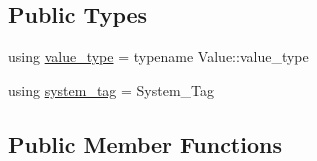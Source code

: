 \subsection*{Public Types}
\begin{DoxyCompactItemize}
\item 
using \hyperlink{structBC_1_1tensors_1_1exprs_1_1Unary__Expression_3_01oper_1_1transpose_3_01System__Tag_01_4_00_01Value_01_4_a0ac68d527f68d869b072a9b93ec42541}{value\+\_\+type} = typename Value\+::value\+\_\+type
\item 
using \hyperlink{structBC_1_1tensors_1_1exprs_1_1Unary__Expression_3_01oper_1_1transpose_3_01System__Tag_01_4_00_01Value_01_4_abac4a581481062c8eaba8281e4d46d7a}{system\+\_\+tag} = System\+\_\+\+Tag
\end{DoxyCompactItemize}
\subsection*{Public Member Functions}
